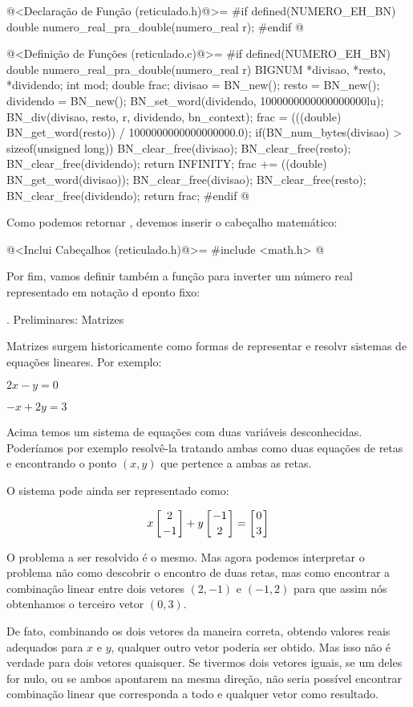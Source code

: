 \iniciocodigo
@<Declaração de Função (reticulado.h)@>=
#if defined(NUMERO_EH_BN)
double numero_real_pra_double(numero_real r);
#endif
@
\fimcodigo

\iniciocodigo
@<Definição de Funções (reticulado.c)@>=
#if defined(NUMERO_EH_BN)
double numero_real_pra_double(numero_real r){
  BIGNUM *divisao, *resto, *dividendo;
  int mod;
  double frac;
  divisao = BN_new();
  resto = BN_new();
  dividendo = BN_new();
  BN_set_word(dividendo, 1000000000000000000lu);  
  BN_div(divisao, resto, r, dividendo, bn_context);
  frac = (((double) BN_get_word(resto)) / 1000000000000000000.0);
  if(BN_num_bytes(divisao) > sizeof(unsigned long)){
    BN_clear_free(divisao);
    BN_clear_free(resto);
    BN_clear_free(dividendo);
    return INFINITY;
  }
  frac += ((double) BN_get_word(divisao));
  BN_clear_free(divisao);
  BN_clear_free(resto);
  BN_clear_free(dividendo);
  return frac;  
}
#endif
@

Como podemos retornar , devemos inserir o
cabeçalho matemático:

\iniciocodigo
@<Inclui Cabeçalhos (reticulado.h)@>=
#include <math.h>
@
\fimcodigo

Por fim, vamos definir também a função para inverter um número real
representado em notação d eponto fixo:



{\twelvebold {}. Preliminares: Matrizes}

Matrizes surgem historicamente como formas de representar e resolvr
sistemas de equações lineares. Por exemplo:

$2x-y=0$

$-x+2y=3$

Acima temos um sistema de equações com duas variáveis
desconhecidas. Poderíamos por exemplo resolvê-la tratando ambas como
duas equações de retas e encontrando o ponto $(x, y)$ que pertence a
ambas as retas.

O sistema pode ainda ser representado como:

$$x\left[{2\atop-1}\right]+y\left[-1\atop 2\right]=\left[0\atop3\right]$$

O problema a ser resolvido é o mesmo. Mas agora podemos interpretar o
problema não como descobrir o encontro de duas retas, mas como
encontrar a combinação linear entre dois vetores $(2, -1)$ e $(-1, 2)$
para que assim nós obtenhamos o terceiro vetor $(0, 3)$.

De fato, combinando os dois vetores da maneira correta, obtendo
valores reais adequados para $x$ e $y$, qualquer outro vetor poderia
ser obtido. Mas isso não é verdade para dois vetores quaisquer. Se
tivermos dois vetores iguais, se um deles for nulo, ou se ambos
apontarem na mesma direção, não seria possível encontrar combinação
linear que corresponda a todo e qualquer vetor como resultado.

